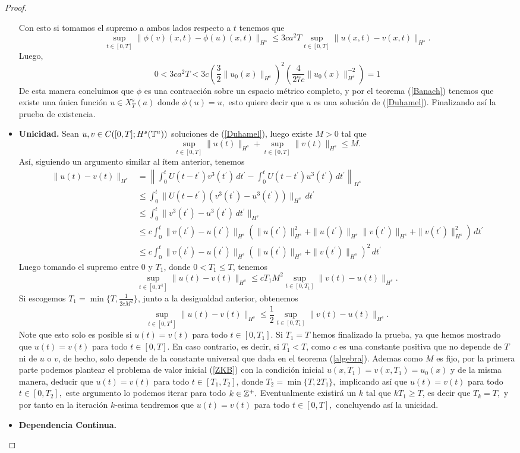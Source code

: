 \begin{proof}
\begin{itemize}
        Con esto si tomamos el supremo a ambos lados respecto a $t$ tenemos que
       $$\sup_{t\in[0,T]}\|\phi(v)(x,t)-\phi(u)(x,t)\|_{H^s}\leq 3ca^2T\sup_{t\in[0,T]}\|u(x,t)-v(x,t)\|_{H^s}.$$
       Luego,
       $$0<3ca^2T<3c\left(\dfrac{3}{2}\|u_0(x)\|_{H^s}\right)^2\left(\dfrac{4}{27c}\|u_0(x)\|^{-2}_{H^s}\right)=1$$
       De esta manera concluimos que $\phi$ es una contracción sobre un espacio métrico completo, y por el teorema (\ref{Banach}) tenemos que existe una única función $u\in X^s_T(a)$ donde $\phi(u)=u,$ esto quiere decir que $u$ es una solución de (\ref{Duhamel}). Finalizando así la prueba de  existencia.
       \item \textbf{Unicidad.} Sean $u,v\in C([0,T];H^s(\mathbb{T}^n))$ soluciones de (\ref{Duhamel}), luego existe $M>0$ tal que
       $$\sup_{t\in[0,T]}\|u(t)\|_{H^s}+\sup_{t\in[0,T]}\|v(t)\|_{H^s}\leq M.$$
       Así, siguiendo un argumento similar al ítem anterior, tenemos
       \begin{align*}
           \|u(t)-v(t)\|_{H^s}&=\left\|\int_0^tU(t-t^\prime)v^3(t^\prime)\,dt^\prime-\int_0^tU(t-t^\prime)u^3(t^\prime)\,dt^\prime\right\|_{H^s}\\
           &\leq\int_0^t\|U(t-t^\prime)(v^3(t^\prime)-u^3(t^\prime))\|_{H^s}\,dt^\prime\\
           &\leq\int_0^t\|v^3(t^\prime)-u^3(t^\prime)\,dt^\prime\|_{H^s}\\
           &\leq c\int_0^t\|v(t^\prime)-u(t^\prime)\|_{H^s}(\|u(t^\prime)\|^2_{H^s}+\|u(t^\prime)\|_{H^s}\|v(t^\prime)\|_{H^s}+\|v(t^\prime)\|^2_{H^s})\,dt^\prime\\
           &\leq c\int_0^t\|v(t^\prime)-u(t^\prime)\|_{H^s}(\|u(t^\prime)\|_{H^s}+\|v(t^\prime)\|_{H^s})^2\,dt^\prime
       \end{align*}
       Luego tomando el supremo entre 0 y $T_1$, donde $0<T_1\leq T$, tenemos
       $$\sup_{t\in[0,T^1]}\|u(t)-v(t)\|_{H^s}\leq cT_1M^2\sup_{t\in[0,T_1]}\|v(t)-u(t)\|_{H^s}. $$
       Si escogemos $T_1=\min\{T,\frac{1}{2cM^2}\}$, junto a la desigualdad anterior, obtenemos
       $$\sup_{t\in[0,T^1]}\|u(t)-v(t)\|_{H^s}\leq \frac{1}{2}\sup_{t\in[0,T_1]}\|v(t)-u(t)\|_{H^s}.$$
       Note que esto solo es posible si $u(t)=v(t)$ para todo $t\in[0,T_1].$ Si $T_1=T$ hemos finalizado la prueba, ya que hemos mostrado que $u(t)=v(t)$ para todo $t\in[0,T].$ En caso contrario, es decir, si $T_1<T$, como $c$ es una constante positiva que no depende de $T$ ni de $u$ o $v$, de hecho, solo depende de la constante universal que dada en el teorema (\ref{algebra}). Ademas como $M$ es fijo, por la primera parte podemos plantear el problema de valor inicial (\ref{ZKB}) con la condición inicial $u(x,T_1)=v(x,T_1)=u_0(x)$ y de la misma manera, deducir que $u(t)=v(t)$ para todo $t\in[T_1,T_2]$, donde $T_2=\min\{T,2T_1\},$ implicando así que $u(t)=v(t)$ para todo $t\in[0,T_2],$ este argumento lo podemos iterar para todo $k\in \mathbb{Z}^+.$ Eventualmente existirá un $k$ tal que $kT_1\geq T$, es decir que $T_k=T,$ y por tanto en la iteración $k$-esima tendremos que $u(t)=v(t)$ para todo $t\in[0,T],$ concluyendo así la unicidad.
       \item \textbf{Dependencia Continua.}



\end{itemize}
\end{proof}

